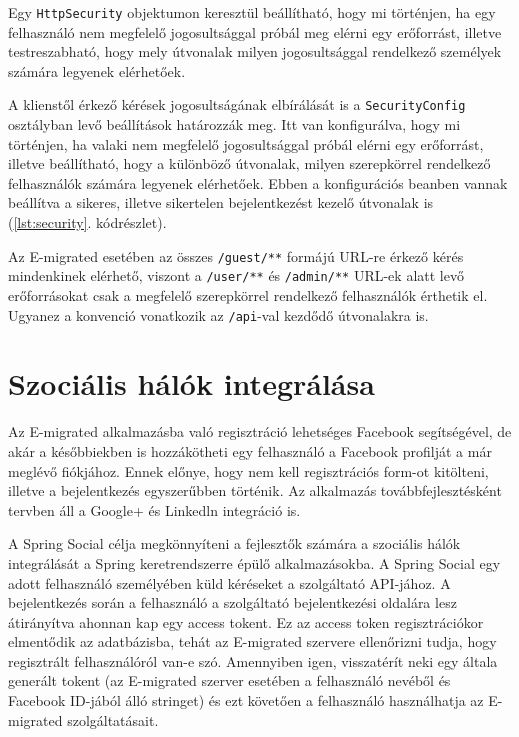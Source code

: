 \begin{reviewed}
\begin{listing}[!b]
  \inputminted[fontsize=\small]{java}{progfiles/security.java}
  \caption{Egy \texttt{HttpSecurity} objektumon keresztül beállítható, hogy mi történjen, ha egy felhasználó nem megfelelő jogosultsággal próbál meg elérni egy erőforrást, illetve testreszabható, hogy mely útvonalak milyen jogosultsággal rendelkező személyek számára legyenek elérhetőek.}
  \label{lst:security}
\end{listing}

A klienstől érkező kérések jogosultságának elbírálását is a \texttt{SecurityConfig} osztályban levő beállítások határozzák meg. Itt van konfigurálva, hogy mi történjen, ha valaki nem megfelelő jogosultsággal próbál elérni egy erőforrást, illetve beállítható, hogy a különböző útvonalak, milyen szerepkörrel rendelkező felhasználók számára legyenek elérhetőek. Ebben a konfigurációs beanben vannak beállítva a sikeres, illetve sikertelen bejelentkezést kezelő útvonalak is (\ref{lst:security}. kódrészlet). 


Az E-migrated esetében az összes \texttt{/guest/**} formájú URL-re érkező kérés mindenkinek elérhető, viszont a \texttt{/user/**} és \texttt{/admin/**} URL-ek alatt levő erőforrásokat csak a megfelelő szerepkörrel rendelkező felhasználók érthetik el. Ugyanez a konvenció vonatkozik az \texttt{/api}-val kezdődő útvonalakra is.

\section{Szociális hálók integrálása}
\label{subsec:szocialisHalo}

Az E-migrated alkalmazásba való regisztráció lehetséges Facebook segítségével, de akár a későbbiekben is hozzákötheti egy felhasználó a Facebook profilját a már meglévő fiókjához. Ennek előnye, hogy nem kell regisztrációs form-ot kitölteni, illetve a bejelentkezés egyszerűbben történik. Az alkalmazás továbbfejlesztésként tervben áll a Google+ és Linkedln integráció is. 


A Spring Social \cite{SpringSocial} célja megkönnyíteni a fejlesztők számára a szociális hálók integrálását a Spring keretrendszerre épülő alkalmazásokba. A Spring Social egy adott felhasználó személyében küld kéréseket a szolgáltató API-jához. A bejelentkezés során a felhasználó a szolgáltató bejelentkezési oldalára lesz átirányítva ahonnan kap egy access tokent. Ez az access token regisztrációkor elmentődik az adatbázisba, tehát az E-migrated szervere ellenőrizni tudja, hogy regisztrált felhasználóról van-e szó. Amennyiben igen, visszatérít neki egy általa generált tokent (az E-migrated szerver esetében a felhasználó nevéből és Facebook ID-jából álló stringet) és ezt követően a felhasználó használhatja az E-migrated szolgáltatásait. 


\end{reviewed}
